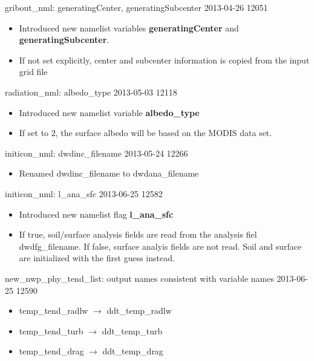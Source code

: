 \begin{changeitem}{gribout\_nml: generatingCenter, generatingSubcenter}{ 2013-04-26 }{ 12051 }
  \begin{itemize}
   \item Introduced new namelist variables \textbf{generatingCenter} and \textbf{generatingSubcenter}.
   \item If not set explicitly, center and subcenter information is copied from the input grid file
  \end{itemize}
\end{changeitem}

\begin{changeitem}{radiation\_nml: albedo\_type}{ 2013-05-03 }{ 12118 }
  \begin{itemize}
   \item Introduced new namelist variable \textbf{albedo\_type}
   \item If set to $2$, the surface albedo will be based on the MODIS data set.
  \end{itemize}
\end{changeitem}

\begin{changeitem}{initicon\_nml: dwdinc\_filename}{ 2013-05-24 }{ 12266 }
  \begin{itemize}
   \item Renamed dwdinc\_filename to dwdana\_filename
  \end{itemize}
\end{changeitem}

\begin{changeitem}{initicon\_nml: l\_ana\_sfc}{ 2013-06-25 }{ 12582 }
  \begin{itemize}
   \item Introduced new namelist flag \textbf{l\_ana\_sfc}
   \item If true, soil/surface analysis fields are read from the analysis fiel dwdfg\_filename.
         If false, surface analyis fields are not read. Soil and surface are initialized with the first guess instead.
  \end{itemize}
\end{changeitem}

\begin{changeitem}{new\_nwp\_phy\_tend\_list: output names consistent with variable names}{ 2013-06-25 }{ 12590 }
  \begin{itemize}
   \item temp\_tend\_radlw $\rightarrow$ ddt\_temp\_radlw
   \item temp\_tend\_turb $\rightarrow$ ddt\_temp\_turb
   \item temp\_tend\_drag $\rightarrow$ ddt\_temp\_drag
  \end{itemize}
\end{changeitem}

